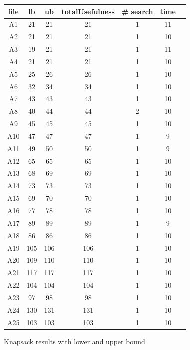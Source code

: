 \documentclass[a4paper ,12pt,french]{article}
\begin{document}
\begin{figure}[!h]
\begin{tabular}{|c|c|c|c|c|c|c|}
\hline
file&lb&ub&totalUsefulness&\# search&time\\
\hline
\hline
A1&21&21&21&1&11\\\hline
A2&21&21&21&1&10\\\hline
A3&19&21&21&1&11\\\hline
A4&21&21&21&1&10\\\hline
A5&25&26&26&1&10\\\hline
A6&32&34&34&1&10\\\hline
A7&43&43&43&1&10\\\hline
A8&40&44&44&2&10\\\hline
A9&45&45&45&1&10\\\hline
A10&47&47&47&1&9\\\hline
A11&49&50&50&1&9\\\hline
A12&65&65&65&1&10\\\hline
A13&68&69&69&1&10\\\hline
A14&73&73&73&1&10\\\hline
A15&69&70&70&1&10\\\hline
A16&77&78&78&1&10\\\hline
A17&89&89&89&1&9\\\hline
A18&86&86&86&1&10\\\hline
A19&105&106&106&1&10\\\hline
A20&109&110&110&1&10\\\hline
A21&117&117&117&1&10\\\hline
A22&104&104&104&1&10\\\hline
A23&97&98&98&1&10\\\hline
A24&130&131&131&1&10\\\hline
A25&103&103&103&1&10\\\hline
\end{tabular}
\caption{Knapsack results with lower and upper bound}
\label{LUA}
\end{figure}
\end{document}
